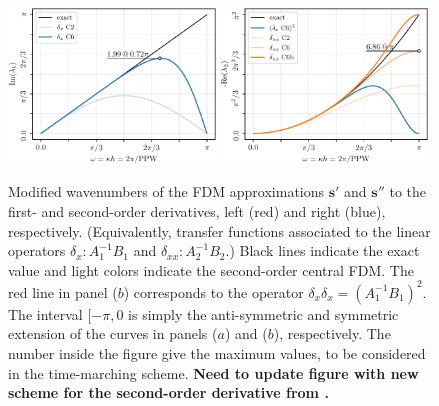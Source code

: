 \begin{figure}
  \includegraphics[clip,width=0.49\textwidth]{figs/Fdm1}\hfill
  \includegraphics[clip,width=0.49\textwidth]{figs/Fdm2}
  \caption{Modified wavenumbers of the FDM approximations $\mathbf{s'}$ and $\mathbf{s''}$ to the first- and second-order derivatives, left (red) and right (blue), respectively. (Equivalently, transfer functions associated to the linear operators $\delta_{x}: A_1^{-1}B_1$ and $\delta_{xx}: A_2^{-1}B_2$.) Black lines indicate the exact value and light colors indicate the second-order central FDM. The red line in panel ($b$) corresponds to the operator $\delta_{x}\delta_{x} =(A_1^{-1}B_1)^2$. The interval $[-\pi,0$ is simply the anti-symmetric and symmetric extension of the curves in panels ($a$) and ($b$), respectively. The number inside the figure give the maximum values, to be considered in the time-marching scheme. {\bf Need to update figure with new scheme for the second-order derivative from \cite{Lamballais:2011}.}}\label{fig:fdm}
\end{figure}

